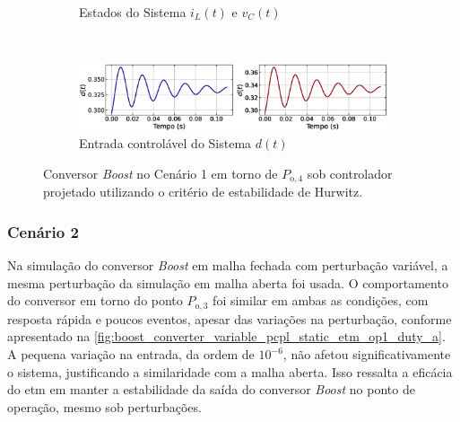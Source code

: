 \begin{figure}[H]
\begin{subfigure}{1.\textwidth}
    \caption{Estados do Sistema $i_L(t)$  e $v_C(t)$}
  \end{subfigure}
  \\[6pt]
  \begin{subfigure}{1.\textwidth}
    \centering
    \includegraphics[width=1.\textwidth]{figuras/classic/boost/sim1/op2/duty-cycle.eps}
    \caption{Entrada controlável do Sistema $d(t)$}
  \end{subfigure}
  \caption{Conversor \textit{Boost }no Cenário 1 em torno de $P_{\mathrm{o}, 4}$ sob controlador projetado utilizando o critério de estabilidade de Hurwitz.}
  \label{fig:classic_boost_cen1_op2}
\end{figure}

\subsubsection{Cenário 2}

Na simulação do conversor \textit{Boost }em malha fechada com perturbação variável, a mesma perturbação da simulação em malha aberta foi usada. O comportamento do conversor em torno do ponto $P_{\mathrm{o}, 3}$ foi similar em ambas as condições, com resposta rápida e poucos eventos, apesar das variações na perturbação, conforme apresentado na \autoref{fig:boost_converter_variable_pcpl_static_etm_op1_duty_a}. A pequena variação na entrada, da ordem de $10^{-6}$, não afetou significativamente o sistema, justificando a similaridade com a malha aberta. Isso ressalta a eficácia do \acrshort{etm} em manter a estabilidade da saída do conversor \textit{Boost }no ponto de operação, mesmo sob perturbações.

